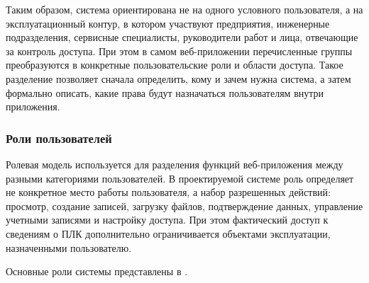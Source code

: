 Таким образом, система ориентирована не на одного условного пользователя, а на эксплуатационный контур, в котором участвуют предприятия, инженерные подразделения, сервисные специалисты, руководители работ и лица, отвечающие за контроль доступа. При этом в самом веб-приложении перечисленные группы преобразуются в конкретные пользовательские роли и области доступа. Такое разделение позволяет сначала определить, кому и зачем нужна система, а затем формально описать, какие права будут назначаться пользователям внутри приложения.


\subsubsection{Роли пользователей}

Ролевая модель используется для разделения функций веб-приложения между разными категориями пользователей. В проектируемой системе роль определяет не конкретное место работы пользователя, а набор разрешенных действий: просмотр, создание записей, загрузку файлов, подтверждение данных, управление учетными записями и настройку доступа. При этом фактический доступ к сведениям о ПЛК дополнительно ограничивается объектами эксплуатации, назначенными пользователю.

Основные роли системы представлены в .

